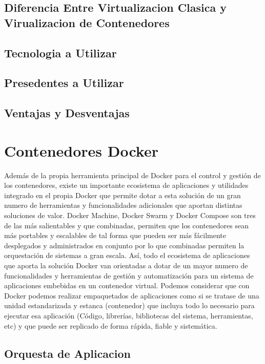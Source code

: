 \documentclass[%
 reprint,
 amsmath,amssymb,
 aps,
]{revtex4-1}
\begin{document}
\subsection{Diferencia Entre Virtualizacion Clasica y Virualizacion de Contenedores}
\subsection{Tecnologia a Utilizar}
\subsection{Presedentes a Utilizar}
\subsection{Ventajas y Desventajas}


\section{Contenedores Docker}\label{sec:6}


Además de la propia herramienta principal de Docker para el control y gestión de los
contenedores, existe un importante ecosistema de aplicaciones y utilidades integrado en el propia
Docker que permite dotar a esta solución de un gran numero de herramientas y funcionalidades
adicionales que aportan distintas soluciones de valor. Docker Machine, Docker Swarm y Docker
Compose son tres de las más salientables y que combinadas, permiten que los contenedores
sean más portables y escalables de tal forma que pueden ser más fácilmente desplegados y
administrados en conjunto por lo que combinadas permiten la orquestación de sistemas a gran
escala. Así, todo el ecosistema de aplicaciones que aporta la solución Docker van orientadas a
dotar de un mayor numero de funcionalidades y herramientas de gestión y automatización para un
sistema de aplicaciones embebidas en un contenedor virtual.
Podemos considerar que con Docker podemos realizar empaquetados de aplicaciones como si se
tratase de una unidad estandarizada y estanca (contenedor) que incluya todo lo necesario para
ejecutar esa aplicación (Código, librerías, bibliotecas del sistema, herramientas, etc) y que puede
ser replicado de forma rápida, fiable y sistemática.

\subsection{Orquesta de Aplicacion}
\end{document}

